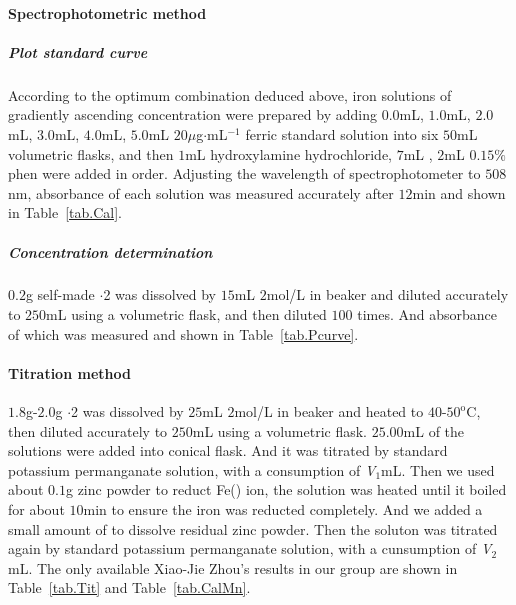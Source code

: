 \paragraph{Spectrophotometric method}

\subparagraph{Plot standard curve}
According to the optimum combination deduced above, iron solutions of gradiently ascending concentration were prepared by adding $0.0$mL, $1.0$mL, $2.0$mL, $3.0$mL, $4.0$mL, $5.0$mL $20\mu$g$\cdot$mL$^{-1}$ ferric standard solution into six $50$mL volumetric flasks, and then $1$mL hydroxylamine hydrochloride, $7$mL , $2$mL $0.15\%$phen were added in order. Adjusting the wavelength of spectrophotometer to $508$nm, absorbance of each solution was measured accurately after $12$min and shown in Table~\ref{tab.Cal}.

\subparagraph{Concentration determination}
$0.2$g self-made $\cdot$2 was dissolved by $15$mL $2$mol/L  in beaker and diluted accurately to $250$mL using a volumetric flask, and then diluted $100$ times. And absorbance of which was measured and shown in Table~\ref{tab.Pcurve}.

\paragraph{Titration method}


$1.8$g-$2.0$g $\cdot$2 was dissolved by $25$mL $2$mol/L  in beaker and heated to $40$-$50^\text{o}$C, then diluted accurately to $250$mL using a volumetric flask. $25.00$mL of the solutions were added into conical flask. And it was titrated by standard potassium permanganate solution, with a consumption of \emph{V$_1$}mL. Then we used about $0.1$g zinc powder to reduct Fe(\uppercase\expandafter{}) ion, the solution was heated until it boiled for about $10$min to ensure the iron was reducted completely. And we added a small amount of  to dissolve residual zinc powder. Then the soluton was titrated again by standard potassium permanganate solution, with a cunsumption of \emph{V$_2$}mL. The only available Xiao-Jie Zhou's results in our group are shown in Table~\ref{tab.Tit} and Table~\ref{tab.CalMn}.


\ifx\SUM\undefined


\fi